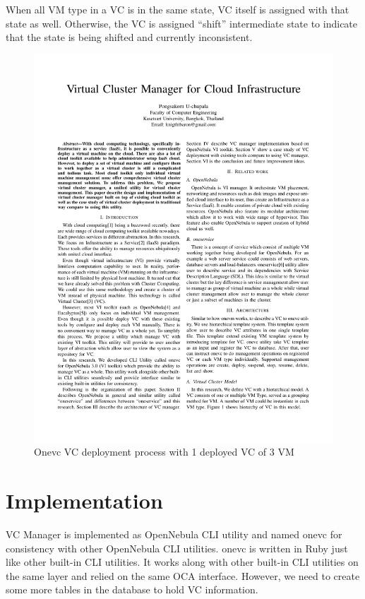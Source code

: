 \documentclass[conference]{IEEEtran}
\begin{document}
When all VM type in a VC is in the same state, VC itself is assigned with that state as well.
Otherwise, the VC is assigned ``shift'' intermediate state to indicate that the state is being shifted and currently inconsistent.

\begin{figure}[!t]
\centering
\includegraphics[width=6.5in]{onevc}
\caption{Onevc VC deployment process with 1 deployed VC of 3 VM}
\label{fig:onevc}
\end{figure}

\section{Implementation}
VC Manager is implemented as OpenNebula CLI utility and named onevc for consistency with other OpenNebula CLI utilities.
onevc is written in Ruby just like other built-in CLI utilities.
It works along with other built-in CLI utilities on the same layer and relied on the same OCA interface.
However, we need to create some more tables in the database to hold VC information.
\end{document}
